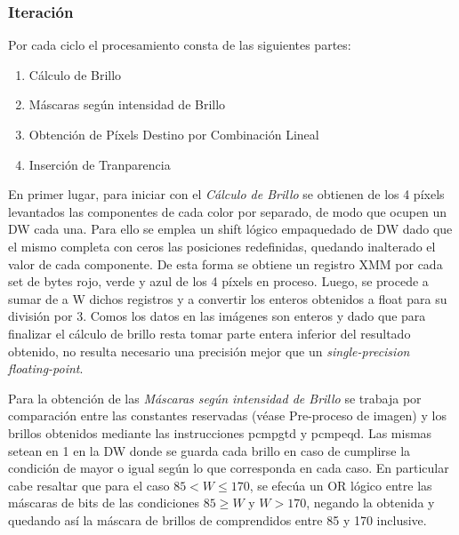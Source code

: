 \subsubsection{Iteración}

Por cada ciclo el procesamiento consta de las siguientes partes:

\begin{enumerate}
  \item Cálculo de Brillo
  \item Máscaras según intensidad de Brillo
  \item Obtención de Píxels Destino por Combinación Lineal
  \item Inserción de Tranparencia
\end{enumerate}

En primer lugar, para iniciar con el \textit{Cálculo de Brillo} se obtienen de los 4 píxels levantados las componentes de cada color por separado, de modo que ocupen un DW cada una. Para ello se emplea un shift lógico empaquedado de DW dado que el mismo completa con ceros las posiciones redefinidas, quedando inalterado el valor de cada componente. De esta forma se obtiene un registro XMM por cada set de bytes rojo, verde y azul de los 4 píxels en proceso.
Luego, se procede a sumar de a W dichos registros y a convertir los enteros obtenidos a float para su división por 3. Comos los datos en las imágenes son enteros y dado que para finalizar el cálculo de brillo resta tomar parte entera inferior del resultado obtenido, no resulta necesario una precisión mejor que un \textit{single-precision floating-point}. 

Para la obtención de las \textit{Máscaras según intensidad de Brillo} se trabaja por comparación entre las constantes reservadas (véase Pre-proceso de imagen) y los brillos obtenidos mediante las instrucciones pcmpgtd y pcmpeqd. Las mismas setean en 1 en la DW donde se guarda cada brillo en caso de cumplirse la condición de mayor o igual según lo que corresponda en cada caso. En particular cabe resaltar que para el caso \(85 < W \leq 170 \), se efecúa un OR lógico entre las máscaras de bits de las condiciones \(85 \geq W \) y \(W > 170 \), negando la obtenida y quedando así la máscara de brillos de comprendidos entre 85 y 170 inclusive. 

